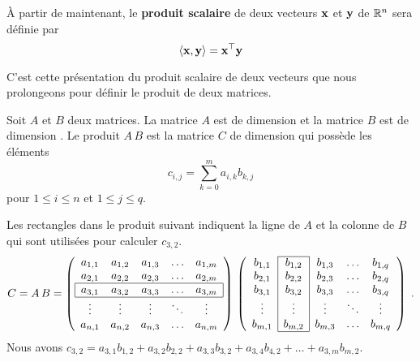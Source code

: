 {\begin{focus}{\dfn}
À partir de maintenant, le
{\bfseries produit scalaire} de deux vecteurs
$\mathbf{x}$ et $\mathbf{y}$ de $\mathbb{R}^n$ sera définie par
\[
  \left\langle{\mathbf{x}} , {\mathbf{y}}\right\rangle = \mathbf{x}^\top \mathbf{y}
\]
\label{pstransposed}
\end{focus}

C'est cette présentation du produit scalaire de deux vecteurs que nous
prolongeons pour définir le produit de deux matrices.

\begin{focus}{\dfn} 
Soit $A$ et $B$ deux matrices.  La matrice $A$ est de dimension
 et la matrice $B$ est de dimension .  Le produit
$A\,B$ est la matrice $C$ de dimension  qui possède les
éléments
\begin{equation}\label{matrixProd}
c_{i,j} = \sum_{k=0}^m a_{i,k} b_{k,j}
\end{equation}
pour $1\leq i \leq n$ et $1\leq j \leq q$.
\end{focus}

Les rectangles dans le produit suivant indiquent la ligne de $A$ et la
colonne de $B$ qui sont utilisées pour calculer $c_{3,2}$.
\[
C = A\,B =
\left(
\begin{array}{ccccc}
a_{1,1} & a_{1,2} & a_{1,3} & \ldots & a_{1,m} \\
a_{2,1} & a_{2,2} & a_{2,3} & \ldots & a_{2,m} \\
\hline
\multicolumn{1}{|c}{a_{3,1}} & a_{3,2} & a_{3,3} & \ldots &
\multicolumn{1}{c|}{a_{3,m}} \\
\hline
\vdots & \vdots & \vdots & \ddots & \vdots \\
a_{n,1} & a_{n,2} & a_{n,3} & \ldots & a_{n,m}
\end{array}
\right)
\,
\left(
\begin{array}{ccccc}
\cline{2-2}
b_{1,1} & \multicolumn{1}{|c|}{b_{1,2}} & b_{1,3} & \ldots & b_{1,q} \\
b_{2,1} & \multicolumn{1}{|c|}{b_{2,2}} & b_{2,3} & \ldots & b_{2,q} \\
b_{3,1} & \multicolumn{1}{|c|}{b_{3,2}} & b_{3,3} & \ldots & b_{3,q} \\
\vdots & \multicolumn{1}{|c|}{\vdots} & \vdots & \ddots & \vdots \\
b_{m,1} & \multicolumn{1}{|c|}{b_{m,2}} & b_{m,3} & \ldots & b_{m,q} \\
\cline{2-2}
\end{array}
\right) \; .
\]
Nous avons $c_{3,2} = a_{3,1}b_{1,2} + a_{3,2}b_{2,2} + a_{3,3}b_{3,2} +
a_{3,4}b_{4,2} + \ldots + a_{3,m}b_{m,2}$.

}
